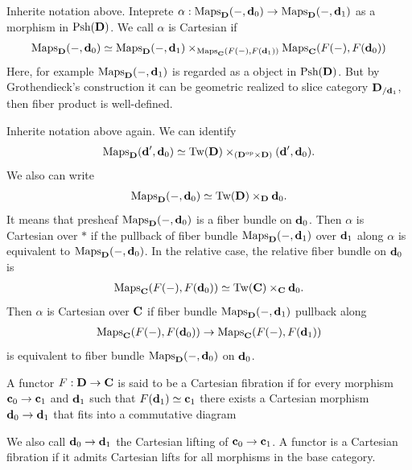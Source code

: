 {\np Inherite notation above. Inteprete $\alpha:\operatorname{Maps}_{\textbf{D}}(-,\textbf{d}_0)\to \operatorname{Maps}_{\textbf{D}}(-,\textbf{d}_1)$ as a morphism in $\text{Psh}(\textbf{D})$. We call $\alpha$ is Cartesian if 
\begin{align*}
    \operatorname{Maps}_{\textbf{D}}(-,\textbf{d}_0) \simeq \operatorname{Maps}_{\textbf{D}}(-,\textbf{d}_1)\times_{\operatorname{Maps}_{\textbf{C}}(F(-),F(\textbf{d}_1))} \operatorname{Maps}_{\textbf{C}}(F(-),F(\textbf{d}_0))
\end{align*}
Here, for example $\operatorname{Maps}_{\textbf{D}}(-,\textbf{d}_1)$ is regarded as a object in $\text{Psh}(\textbf{D})$. But by Grothendieck's construction it can be geometric realized to slice category $\textbf{D}_{/\textbf{d}_1}$, then fiber product is well-defined.

\np Inherite notation above again. We can identify 
\begin{align*}
    \operatorname{Maps}_{\textbf{D}}(\textbf{d}',\textbf{d}_0) \simeq \text{Tw(\textbf{D})} \times_{(\textbf{D}^{\text{op}}\times \textbf{D})} {(\textbf{d}',\textbf{d}_0)}.
\end{align*}
We also can write
\begin{align*}
    \operatorname{Maps}_{\textbf{D}}(-,\textbf{d}_0) \simeq \text{Tw(\textbf{D})} \times_{ \textbf{D}} {\textbf{d}_0}.
\end{align*}
It means that presheaf $\operatorname{Maps}_{\textbf{D}}(-,\textbf{d}_0)$ is a fiber bundle on $\textbf{d}_0$.
Then $\alpha$ is Cartesian over $*$ if the pullback of fiber bundle $\operatorname{Maps}_{\textbf{D}}(-,\textbf{d}_1)$ over $\textbf{d}_1$ along $\alpha$ is equivalent to $\operatorname{Maps}_{\textbf{D}}(-,\textbf{d}_0)$.
In the relative case, the relative fiber bundle on $\textbf{d}_0$ is 
\begin{align*}
    \text{Maps}_{\mathbf{C}}(F(-), F(\textbf{d}_0))\simeq \text{Tw(\textbf{C})}\times_{\textbf{C}}{\textbf{d}_0}.
\end{align*}
Then $\alpha$ is Cartesian over $\textbf{C}$ if fiber bundle $\operatorname{Maps}_{\textbf{D}}(-,\textbf{d}_1)$ pullback along 
\begin{align*}
    \operatorname{Maps}_{\textbf{C}}(F(-),F(\textbf{d}_0)) \to \operatorname{Maps}_{\textbf{C}}(F(-),F(\textbf{d}_1))
\end{align*}
is equivalent to fiber bundle $\operatorname{Maps}_{\textbf{D}}(-,\textbf{d}_0)$ on $\textbf{d}_0$.

\np A functor $F:\textbf{D}\to\textbf{C}$ is said to be a Cartesian fibration if for every morphism $\textbf{c}_0\to \textbf{c}_1$ and $\textbf{d}_1$ such that $F(\textbf{d}_1)\simeq \textbf{c}_1$ there exists a 
Cartesian morphism $\textbf{d}_0\to\textbf{d}_1$ that fits into a commutative diagram
\begin{center}
\end{center}
We also call $\textbf{d}_0\to\textbf{d}_1$ the Cartesian lifting of $\textbf{c}_0\to\textbf{c}_1$.
A functor is a Cartesian fibration if it admits Cartesian lifts for all morphisms in the base category.


}
